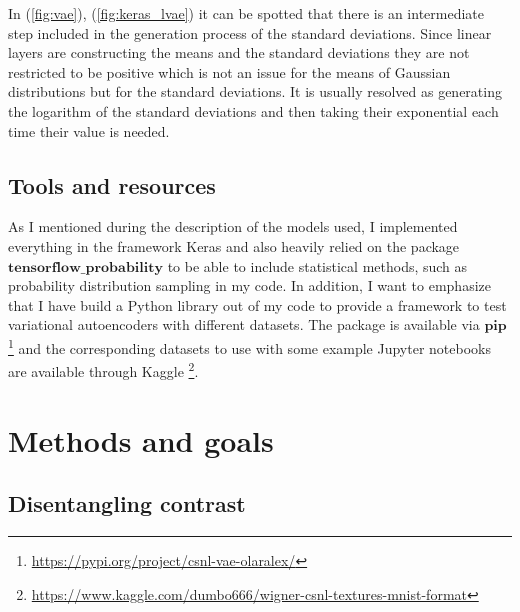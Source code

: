 \documentclass[12pt, english]{article}
\begin{document}
\vspace{4mm}

\par In (\ref{fig:vae}), (\ref{fig:keras_lvae}) it can be spotted that there is an intermediate step included in the generation process of the standard deviations. Since linear layers are constructing the means and the standard deviations they are not restricted to be positive which is not an issue for the means of Gaussian distributions but for the standard deviations. It is usually resolved as generating the logarithm of the standard deviations and then taking their exponential each time their value is needed.

\vspace{5mm}

\subsection{Tools and resources}

\vspace{5mm}

\par As I mentioned during the description of the models used, I implemented everything in the framework Keras and also heavily relied on the package $\bm{tensorflow\_probability}$ to be able to include statistical methods, such as probability distribution sampling in my code. In addition, I want to emphasize that I have build a Python library out of my code to provide a framework to test variational autoencoders with different datasets. The package is available via $\bm{pip}$ \footnote{\url{https://pypi.org/project/csnl-vae-olaralex/}} and the corresponding datasets to use with some example Jupyter notebooks are available through Kaggle \footnote{\url{https://www.kaggle.com/dumbo666/wigner-csnl-textures-mnist-format}}.

\newpage

\section{Methods and goals}

\vspace{7mm}

\subsection{Disentangling contrast}

\vspace{5mm}
\end{document}
